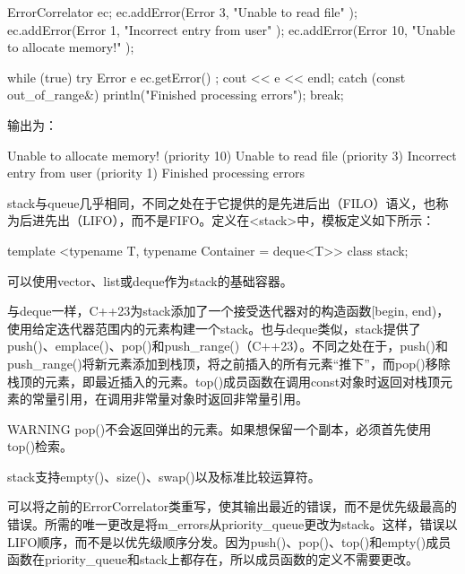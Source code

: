 \begin{cpp}
ErrorCorrelator ec;
ec.addError(Error { 3, "Unable to read file" });
ec.addError(Error { 1, "Incorrect entry from user" });
ec.addError(Error { 10, "Unable to allocate memory!" });

while (true) {
    try {
        Error e { ec.getError() };
        cout << e << endl;
    } catch (const out_of_range&) {
        println("Finished processing errors");
        break;
    }
}
\end{cpp}

输出为：

\begin{shell}
Unable to allocate memory! (priority 10)
Unable to read file (priority 3)
Incorrect entry from user (priority 1)
Finished processing errors
\end{shell}


stack与queue几乎相同，不同之处在于它提供的是先进后出（FILO）语义，也称为后进先出（LIFO），而不是FIFO。定义在<stack>中，模板定义如下所示：

\begin{cpp}
template <typename T, typename Container = deque<T>> class stack;
\end{cpp}

可以使用vector、list或deque作为stack的基础容器。


与deque一样，C++23为stack添加了一个接受迭代器对的构造函数[begin, end)，使用给定迭代器范围内的元素构建一个stack。也与deque类似，stack提供了push()、emplace()、pop()和push\_range()（C++23）。不同之处在于，push()和push\_range()将新元素添加到栈顶，将之前插入的所有元素“推下”，而pop()移除栈顶的元素，即最近插入的元素。top()成员函数在调用const对象时返回对栈顶元素的常量引用，在调用非常量对象时返回非常量引用。

\begin{myWarning}{WARNING}
pop()不会返回弹出的元素。如果想保留一个副本，必须首先使用top()检索。
\end{myWarning}

stack支持empty()、size()、swap()以及标准比较运算符。


可以将之前的ErrorCorrelator类重写，使其输出最近的错误，而不是优先级最高的错误。所需的唯一更改是将m\_errors从priority\_queue更改为stack。这样，错误以LIFO顺序，而不是以优先级顺序分发。因为push()、pop()、top()和empty()成员函数在priority\_queue和stack上都存在，所以成员函数的定义不需要更改。











